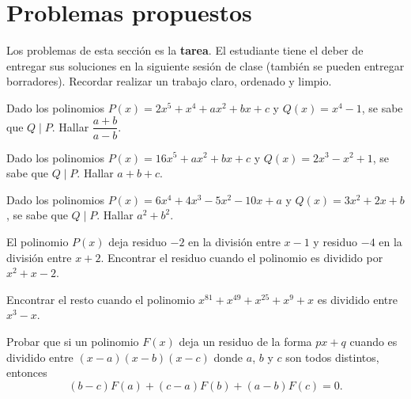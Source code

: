\section{Problemas propuestos}

Los problemas de esta sección es la \textbf{tarea}.
El estudiante tiene el deber de entregar sus soluciones en la siguiente sesión de clase (también se pueden entregar borradores).
Recordar realizar un trabajo claro, ordenado y limpio.

\showLine
\begin{multicols}{2}
    \begin{problem}
        Dado los polinomios $P(x) = 2x^5 + x^4 + ax^2 + bx + c$ y $Q(x) = x^4 - 1$, se sabe que $Q \mid P$.
        Hallar $\dfrac{a + b}{a - b}$.
    \end{problem}

    \begin{problem}
        Dado los polinomios $P(x) = 16x^5 + ax^2 + bx + c$ y $Q(x) = 2 x^3 - x^2 + 1$, se sabe que $Q \mid P$.
        Hallar $a + b + c$.
    \end{problem}

    \begin{problem}
        Dado los polinomios $P(x) = 6x^4 + 4x^3 - 5x^2 - 10x + a$ y $Q(x) = 3 x^2 + 2x + b$, se sabe que $Q \mid P$.
        Hallar $a^2 + b^2$.
    \end{problem}

    \begin{problem}
        El polinomio $P(x)$ deja residuo $-2$ en la división entre $x - 1$ y residuo $-4$ en la división entre $x + 2$.
        Encontrar el residuo cuando el polinomio es dividido por $x^2 + x - 2$.
    \end{problem}

    \begin{problem}
        Encontrar el resto cuando el polinomio $x^{81} + x^{49} + x^{25} + x^9 + x$ es dividido entre $x^3 - x$.
    \end{problem}

    \begin{problem}
        Probar que si un polinomio $F(x)$ deja un residuo de la forma $px + q$ cuando es dividido entre $(x - a)(x - b)(x - c)$
        donde $a$, $b$ y $c$ son todos distintos, entonces
        \[
            (b - c)F(a) + (c - a)F(b) + (a - b)F(c) = 0.
        \]
    \end{problem}
\end{multicols}